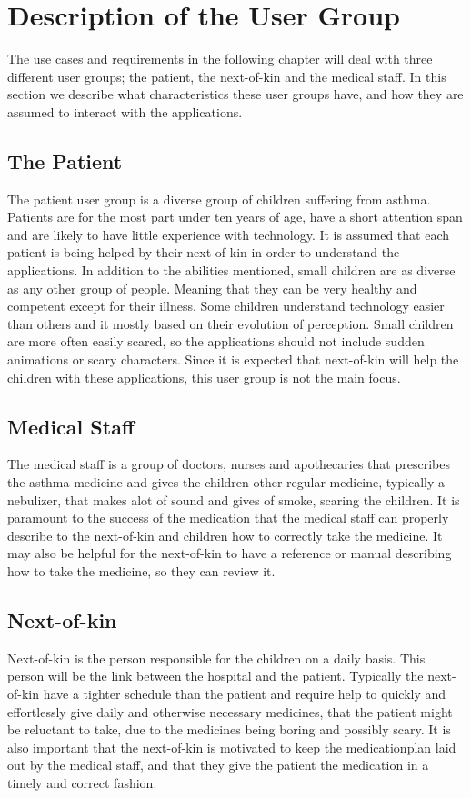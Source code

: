 \section{Description of the User Group}
\label{descriptionoftheusergroups}

The use cases and requirements in the following chapter will deal with three different user groups; the patient, the next-of-kin and the medical staff. In this section we describe what characteristics these user groups have, and how they are assumed to interact with the applications.

\subsection{The Patient}
The patient user group is a diverse group of children suffering from asthma. Patients are for the most part under ten years of age, have a short attention span and are likely to have little experience with technology. It is assumed that each patient is being helped by their next-of-kin in order to understand the applications.
In addition to the abilities mentioned, small children are as diverse as any other group of people. Meaning that they can be very healthy and competent except for their illness. Some children understand technology easier than others and it mostly based on their evolution of perception. Small children are more often easily scared, so the applications should not include sudden animations or scary characters.
Since it is expected that next-of-kin will help the children with these applications, this user group is not the main focus. 

\subsection{Medical Staff}
The medical staff is a group of doctors, nurses and apothecaries that prescribes the asthma medicine and gives the children other regular medicine, typically a nebulizer, that makes alot of sound and gives of smoke, scaring the children. It is paramount to the success of the medication that the medical staff can properly describe to the next-of-kin and children how to correctly take the medicine. It may also be helpful for the next-of-kin to have a reference or manual describing how to take the medicine, so they can review it.

\subsection{Next-of-kin}
Next-of-kin is the person responsible for the children on a daily basis. This person will be the link between the hospital and the patient. 
Typically the next-of-kin have a tighter schedule than the patient and require help to quickly and effortlessly give daily and otherwise necessary medicines, that the patient might be reluctant to take, due to the medicines being boring and possibly scary. It is also important that the next-of-kin is motivated to keep the medicationplan laid out by the medical staff, and that they give the patient the medication in a timely and correct fashion.